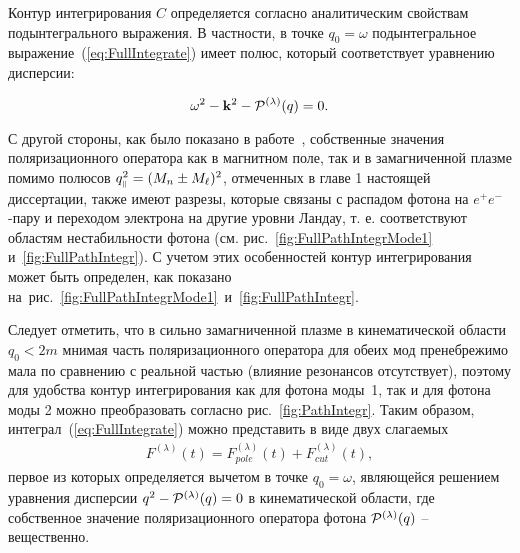 Контур интегрирования $C$ определяется согласно аналитическим свойствам подынтегрального выражения. В частности, в точке $q_0=\omega$ подынтегральное выражение~(\ref{eq:FullIntegrate}) имеет полюс, который соответствует уравнению дисперсии:

\begin{equation}
	\omega^2 - \vec{k}^2 - {\cal P^{(\lambda)}}(q)=0.
\end{equation}

С другой стороны, как было показано в работе~\cite{MikhChist:2001}, собственные значения поляризационного оператора как в магнитном поле, так и в замагниченной плазме помимо полюсов $q_{\mprl}^2=(M_n\pm M_\ell)^2$, отмеченных в главе 1 настоящей диссертации, также имеют разрезы, которые связаны с распадом фотона на $e^+e^-$-пару и переходом электрона на другие уровни Ландау, т. е. соответствуют областям нестабильности фотона (см. рис.~\ref{fig:FullPathIntegrMode1} и~\ref{fig:FullPathIntegr}). С учетом этих особенностей  контур интегрирования может быть определен, как показано на~рис.~\ref{fig:FullPathIntegrMode1}~и~\ref{fig:FullPathIntegr}.

Следует отметить, что в сильно замагниченной плазме в кинематической области $q_0<2m$ мнимая часть поляризационного оператора для обеих мод пренебрежимо мала по сравнению с реальной частью (влияние резонансов отсутствует), поэтому для удобства контур интегрирования как для фотона моды~1, так и для фотона моды 2 можно преобразовать согласно рис.~\ref{fig:PathIntegr}. Таким образом, интеграл~(\ref{eq:FullIntegrate}) можно представить в виде двух слагаемых
\begin{eqnarray}
F^{(\lambda)}(t) = F^{(\lambda)}_{pole}(t) + F^{(\lambda)}_{cut}(t),
\label{eq:19}
\end{eqnarray}
%
первое из которых определяется вычетом в точке $q_0 = \omega$, являющейся
решением уравнения дисперсии $q^2 - {\cal P}^{(\lambda)}(q) = 0$ в кинематической области, где собственное 
значение поляризационного оператора фотона ${\cal P}^{(\lambda)}(q)$ -- вещественно. 


